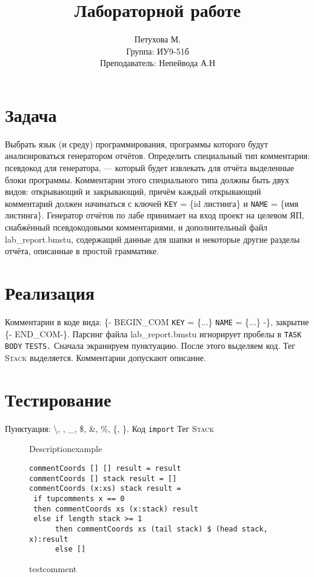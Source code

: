 \documentclass[14pt,russian]{scrartcl}
\title{Лабораторной работе }
\author{Петухова М.\\Группа: ИУ9-51б\\Преподаватель: Непейвода А.Н}
\begin{document}
\maketitle
\section{Задача}
 Выбрать язык (и среду) программирования, программы которого будут анализироваться генератором отчётов. Определить специальный тип комментария: псевдокод для генератора, — который будет извлекать для отчёта выделенные блоки программы. Комментарии этого специального типа должны быть двух видов: открывающий и закрывающий, причём каждый открывающий комментарий должен начинаться с ключей \texttt{KEY}
 = \{id листинга\} и \texttt{NAME}
 = \{имя листинга\}. Генератор отчётов по лабе принимает на вход проект на целевом ЯП, снабжённый псевдокодовыми комментариями, и дополнительный файл lab\_report.bmstu, содержащий данные для шапки и некоторые другие разделы отчёта, описанные в простой грамматике.
\section{Реализация}
 Комментарии в коде вида: \{- BEGIN\_COM \texttt{KEY}
 = \{...\} \texttt{NAME}
 = \{...\} -\}, закрытие \{- END\_COM-\}. Парсинг файла lab\_report.bmstu игнорирует пробелы в \texttt{TASK}
 \texttt{BODY}
 \texttt{TESTS.}
 Сначала экранируем пунктуацию. После этого выделяем код. Тег \textsc{Stack}
выделяется. Комментарии допускают описание.
\section{Тестирование}
 Пунктуация: \textbackslash, \textnumero, \_, \$, \&, \%, \{, \}. Код \texttt{import}
 Тег \textsc{Stack}
 \begin{figure}[htb]
\footnotesize
Descriptionexample\begin{verbatim}
commentCoords [] [] result = result
commentCoords [] stack result = []
commentCoords (x:xs) stack result =
 if tupcomments x == 0
 then commentCoords xs (x:stack) result
 else if length stack >= 1
      then commentCoords xs (tail stack) $ (head stack, x):result
      else []
\end{verbatim}
\caption{testcomment}
\end{figure}
\end{document}

